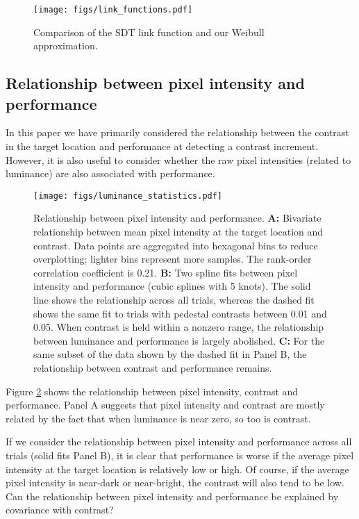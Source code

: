 \documentclass[11pt,a4paper]{article}
\begin{document}
{%
\begin{figure}[H]
\begin{center}
\texttt{[image: figs/link\_functions.pdf]}
\end{center}
\caption{
Comparison of the SDT link function and our Weibull approximation.
}
\label{fig:weibull_approx}
\end{figure}


\subsection{Relationship between pixel intensity and performance}
\label{app:pixel_intensity}

In this paper we have primarily considered the relationship between the contrast in the target location and performance at detecting a contrast increment.
However, it is also useful to consider whether the raw pixel intensities (related to luminance) are also associated with performance.

\begin{figure}[H]
\begin{center}
\texttt{[image: figs/luminance\_statistics.pdf]}
\end{center}
\caption{
Relationship between pixel intensity and performance.
\textbf{A:} Bivariate relationship between mean pixel intensity at the target location and contrast. 
Data points are aggregated into hexagonal bins to reduce overplotting; lighter bins represent more samples. 
The rank-order correlation coefficient is 0.21.
\textbf{B:} Two spline fits between pixel intensity and performance (cubic splines with 5 knots).
The solid line shows the relationship across all trials, whereas the dashed fit shows the same fit to trials with pedestal contrasts between 0.01 and 0.05.  
When contrast is held within a nonzero range, the relationship between luminance and performance is largely abolished. 
\textbf{C:} For the same subset of the data shown by the dashed fit in Panel B, the relationship between contrast and performance remains.
}
\label{fig:luminance_statistics}
\end{figure}

Figure \ref{fig:luminance_statistics} shows the relationship between pixel intensity, contrast and performance.
Panel A suggests that pixel intensity and contrast are mostly related by the fact that when luminance is near zero, so too is contrast.

If we consider the relationship between pixel intensity and performance across all trials (solid fits Panel B), it is clear that performance is worse if the average pixel intensity at the target location is relatively low or high. 
Of course, if the average pixel intensity is near-dark or near-bright, the contrast will also tend to be low.
Can the relationship between pixel intensity and performance be explained by covariance with contrast?

}
\end{document}
